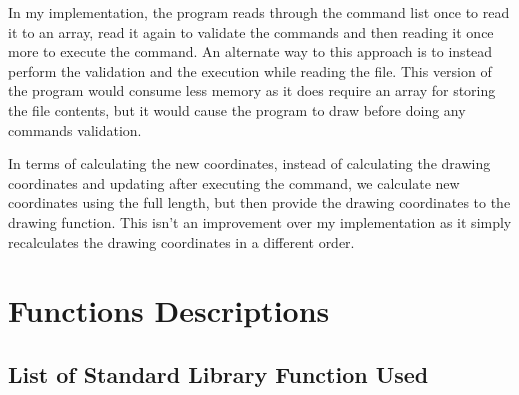 \documentclass[a4paper, 12pt, titlepage]{article}
\begin{document}
In my implementation, the program reads through the command list once to 
read it to an array, read it again to validate the commands and then 
reading it once more to execute the command. An alternate way to this 
approach is to instead perform the validation and the execution while reading 
the file. This version of the program would consume less memory as it does 
require an array for storing the file contents, but it would cause the 
program to draw before doing any commands validation.

In terms of calculating the new coordinates, instead of calculating the 
drawing coordinates and updating after executing the command, we calculate 
new coordinates using the full length, but then provide the drawing 
coordinates to the drawing function. This isn't an improvement over my 
implementation as it simply recalculates the drawing coordinates in a 
different order.

\newpage


\section{Functions Descriptions}

\subsection{List of Standard Library Function Used}
\end{document}
